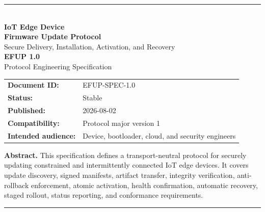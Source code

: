 \documentclass[11pt,a4paper]{article}
\begin{document}
\hypersetup{pageanchor=false}
\begin{titlepage}
  \centering
  \vspace*{24mm}
  {\color{navy}\rule{\textwidth}{1.2pt}}\\[13mm]
  {\Huge\bfseries\color{navy} IoT Edge Device\\[4mm]
  Firmware Update Protocol}\\[7mm]
  {\Large Secure Delivery, Installation, Activation, and Recovery}\\[15mm]
  {\LARGE\bfseries EFUP 1.0}\\[4mm]
  {\large Protocol Engineering Specification}\\[18mm]

  \begin{tabular}{@{}ll@{}}
    \textbf{Document ID:} & EFUP-SPEC-1.0 \\
    \textbf{Status:} & Stable \\
    \textbf{Published:} & 2026-08-02 \\
    \textbf{Compatibility:} & Protocol major version 1 \\
    \textbf{Intended audience:} & Device, bootloader, cloud, and security engineers
  \end{tabular}

  \vfill
  \begin{minipage}{0.88\textwidth}
    \small
    \textbf{Abstract.}
    This specification defines a transport-neutral protocol for securely updating
    constrained and intermittently connected IoT edge devices. It covers update
    discovery, signed manifests, artifact transfer, integrity verification,
    anti-rollback enforcement, atomic activation, health confirmation, automatic
    recovery, staged rollout, status reporting, and conformance requirements.
  \end{minipage}
  \vfill
  {\color{navy}\rule{\textwidth}{1.2pt}}
\end{titlepage}
\hypersetup{pageanchor=true}

\end{document}
